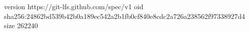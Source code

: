 version https://git-lfs.github.com/spec/v1
oid sha256:24862bd539b42b0a189ec542a2b1fb0cf840e8cdc2a726a238562f97338927d4
size 262240
